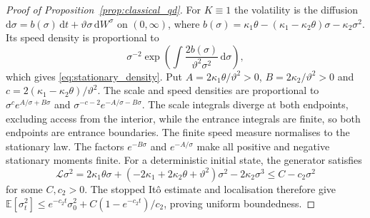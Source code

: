 \documentclass{rQUF2e}
\theoremstyle{plain}
\theoremstyle{definition}
\theoremstyle{remark}
\newcommand{\D}{\mathrm{d}}
\newcommand{\E}{\mathbb{E}}
\begin{document}
\begin{proof}[Proof of Proposition~\ref{prop:classical_qd}] For $K\equiv1$ the volatility is the diffusion $\D\sigma=b(\sigma)\,\D t+\vartheta\sigma\,\D W^\sigma$ on $(0,\infty)$, where $b(\sigma)=\kappa_1\theta-(\kappa_1-\kappa_2\theta)\sigma-\kappa_2\sigma^2$. Its speed density is proportional to
\begin{equation*}
\sigma^{-2}\exp\left(\int \frac{2b(\sigma)}{\vartheta^2\sigma^2}\,\D\sigma\right),
\end{equation*}
which gives \eqref{eq:stationary_density}. Put $A=2\kappa_1\theta/\vartheta^2>0$, $B=2\kappa_2/\vartheta^2>0$ and $c=2(\kappa_1-\kappa_2\theta)/\vartheta^2$. The scale and speed densities are proportional to $\sigma^c e^{A/\sigma+B\sigma}$ and $\sigma^{-c-2}e^{-A/\sigma-B\sigma}$. The scale integrals diverge at both endpoints, excluding access from the interior, while the entrance integrals are finite, so both endpoints are entrance boundaries. The finite speed measure normalises to the stationary law. The factors $e^{-B\sigma}$ and $e^{-A/\sigma}$ make all positive and negative stationary moments finite.
For a deterministic initial state, the generator satisfies
\begin{equation*}
\mathcal L\sigma^2=2\kappa_1\theta\sigma+
(-2\kappa_1+2\kappa_2\theta+\vartheta^2)\sigma^2-2\kappa_2\sigma^3
\le C-c_2\sigma^2
\end{equation*}
for some $C,c_2>0$. The stopped It\^o estimate and localisation therefore give
$\E[\sigma_t^2]\le e^{-c_2t}\sigma_0^2+C(1-e^{-c_2t})/c_2$, proving uniform boundedness. \end{proof}
\end{document}
